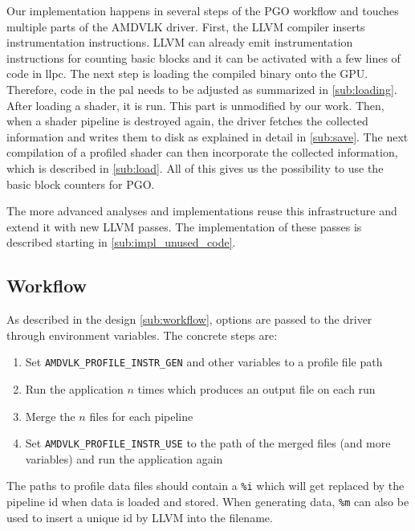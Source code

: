 \clearpage
{}
Our implementation happens in several steps of the PGO workflow and touches multiple parts of the AMDVLK driver.
First, the LLVM compiler inserts instrumentation instructions.
LLVM can already emit instrumentation instructions for counting basic blocks and it can be activated with a few lines of code in \acrfull{llpc}.
The next step is loading the compiled binary onto the GPU. Therefore, code in the \acrfull{pal} needs to be adjusted as summarized in \cref{sub:loading}.
After loading a shader, it is run. This part is unmodified by our work.
Then, when a shader pipeline is destroyed again, the driver fetches the collected information and writes them to disk as explained in detail in \cref{sub:save}.
The next compilation of a profiled shader can then incorporate the collected information, which is described in \cref{sub:load}. All of this gives us the possibility to use the basic block counters for PGO.

The more advanced analyses and implementations reuse this infrastructure and extend it with new LLVM passes. The implementation of these passes is described starting in \cref{sub:impl_unused_code}.

\subsection{Workflow}
\label{sub:impl_workflow}
As described in the design \cref{sub:workflow}, options are passed to the driver through environment variables.
The concrete steps are:
\begin{enumerate}
	\item Set \texttt{AMDVLK\_PROFILE\_INSTR\_GEN} and other variables to a profile file path
	\item Run the application $n$ times which produces an output file on each run
	\item Merge the $n$ files for each pipeline
	\item Set \texttt{AMDVLK\_PROFILE\_INSTR\_USE} to the path of the merged files (and more variables) and run the application again
\end{enumerate}
The paths to profile data files should contain a \texttt{\%i} which will get replaced by the pipeline id when data is loaded and stored.
When generating data, \texttt{\%m} can also be used to insert a unique id by LLVM into the filename.

